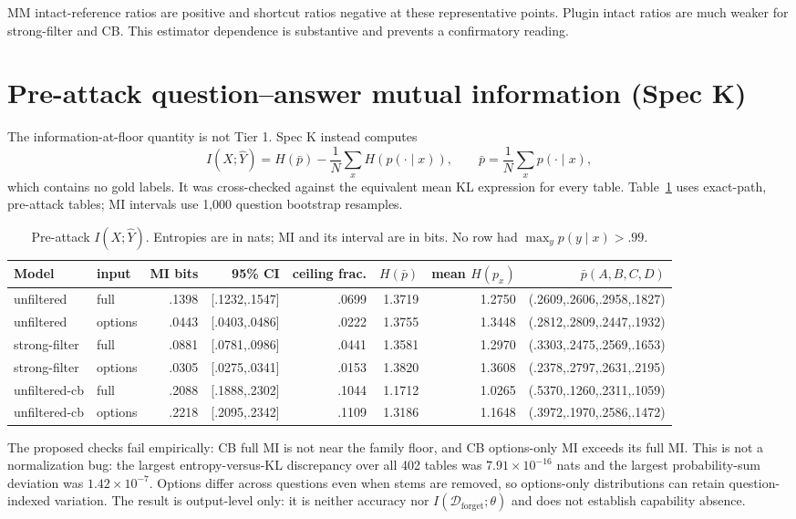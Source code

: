 \documentclass[11pt]{article}
\begin{document}
MM intact-reference ratios are positive and shortcut ratios negative at these
representative points.  Plugin intact ratios are much weaker for
strong-filter and CB.  This estimator dependence is substantive and prevents
a confirmatory reading.

\section{Pre-attack question--answer mutual information (Spec K)}
The information-at-floor quantity is not Tier 1.  Spec K instead computes
\[
 I(X;\widehat Y)=H(\bar p)-\frac{1}{N}\sum_x H(p(\cdot\mid x)),
 \qquad \bar p=\frac{1}{N}\sum_x p(\cdot\mid x),
\]
which contains no gold labels.  It was cross-checked against the equivalent
mean KL expression for every table.  Table~\ref{tab:spec-k} uses exact-path,
pre-attack tables; MI intervals use 1,000 question bootstrap resamples.
\begin{table}[h]
\centering\scriptsize
\begin{tabular}{llrrrrrr}
\toprule
Model & input & MI bits & 95\% CI & ceiling frac. & $H(\bar p)$ & mean $H(p_x)$ & $\bar p(A,B,C,D)$\\
\midrule
unfiltered & full & .1398 & [.1232,.1547] & .0699 & 1.3719 & 1.2750 & (.2609,.2606,.2958,.1827)\\
unfiltered & options & .0443 & [.0403,.0486] & .0222 & 1.3755 & 1.3448 & (.2812,.2809,.2447,.1932)\\
strong-filter & full & .0881 & [.0781,.0986] & .0441 & 1.3581 & 1.2970 & (.3303,.2475,.2569,.1653)\\
strong-filter & options & .0305 & [.0275,.0341] & .0153 & 1.3820 & 1.3608 & (.2378,.2797,.2631,.2195)\\
unfiltered-cb & full & .2088 & [.1888,.2302] & .1044 & 1.1712 & 1.0265 & (.5370,.1260,.2311,.1059)\\
unfiltered-cb & options & .2218 & [.2095,.2342] & .1109 & 1.3186 & 1.1648 & (.3972,.1970,.2586,.1472)\\
\bottomrule
\end{tabular}
\caption{Pre-attack $I(X;\widehat Y)$. Entropies are in nats; MI and its
interval are in bits. No row had $\max_y p(y\mid x)>.99$.}\label{tab:spec-k}
\end{table}

The proposed checks fail empirically: CB full MI is not near the family floor,
and CB options-only MI exceeds its full MI.  This is not a normalization bug:
the largest entropy-versus-KL discrepancy over all 402 tables was
$7.91\times10^{-16}$ nats and the largest probability-sum deviation was
$1.42\times10^{-7}$.  Options differ across questions even when stems are
removed, so options-only distributions can retain question-indexed variation.
The result is output-level only: it is neither accuracy nor
$I(\mathcal D_{\mathrm{forget}};\theta)$ and does not establish capability
absence.
\end{document}
